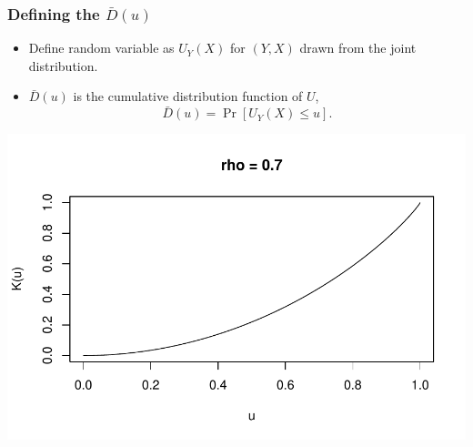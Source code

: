 \documentclass{beamer}
\begin{document}
\begin{frame}
\frametitle{Defining the $\bar{D}(u)$}
\begin{itemize}
\item Define random variable as $U_Y(X)$ for $(Y, X)$ drawn from the joint distribution.\pause
\item $\bar{D}(u)$ is the cumulative distribution function of $U$,
\[
\bar{D}(u) = \Pr[U_Y(X) \leq u].
\]
\pause
\end{itemize}
\begin{center}
\includegraphics[scale = 0.45]{../extrapolation/illus_kfunc_0_7.pdf}
\end{center}
\end{frame}
\end{document}
